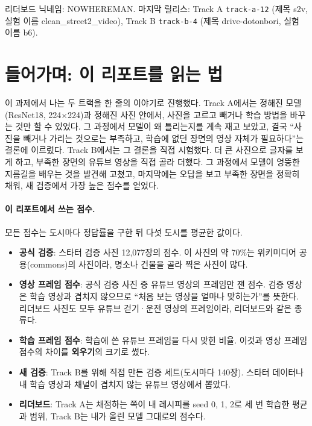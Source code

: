 \documentclass[11pt]{article}
\begin{document}
\makeheader

리더보드 닉네임: NOWHEREMAN. 마지막 릴리스: Track A \texttt{track-a-12} (제목 s2v, 실험 이름 clean\_street2\_video), Track B \texttt{track-b-4} (제목 drive-dotonbori, 실험 이름 b6).

\section*{들어가며: 이 리포트를 읽는 법}

이 과제에서 나는 두 트랙을 한 줄의 이야기로 진행했다. Track A에서는 정해진 모델(ResNet18, 224×224)과 정해진 사진 안에서, 사진을 고르고 빼거나 학습 방법을 바꾸는 것만 할 수 있었다. 그 과정에서 모델이 왜 틀리는지를 계속 재고 보았고, 결국 ``사진을 빼거나 가리는 것으로는 부족하고, 학습에 없던 장면의 영상 자체가 필요하다''는 결론에 이르렀다. Track B에서는 그 결론을 직접 시험했다. 더 큰 사진으로 글자를 보게 하고, 부족한 장면의 유튜브 영상을 직접 골라 더했다. 그 과정에서 모델이 엉뚱한 지름길을 배우는 것을 발견해 고쳤고, 마지막에는 오답을 보고 부족한 장면을 정확히 채워, 새 검증에서 가장 높은 점수를 얻었다.

\paragraph{이 리포트에서 쓰는 점수.} 모든 점수는 도시마다 정답률을 구한 뒤 다섯 도시를 평균한 값이다.
\begin{itemize}
\item \textbf{공식 검증}: 스타터 검증 사진 12,077장의 점수. 이 사진의 약 70\%는 위키미디어 공용(commons)의 사진이라, 명소나 건물을 골라 찍은 사진이 많다.
\item \textbf{영상 프레임 점수}: 공식 검증 사진 중 유튜브 영상의 프레임만 잰 점수. 검증 영상은 학습 영상과 겹치지 않으므로 ``처음 보는 영상을 얼마나 맞히는가''를 뜻한다. 리더보드 사진도 모두 유튜브 걷기·운전 영상의 프레임이라, 리더보드와 같은 종류다.
\item \textbf{학습 프레임 점수}: 학습에 쓴 유튜브 프레임을 다시 맞힌 비율. 이것과 영상 프레임 점수의 차이를 \textbf{외우기}의 크기로 썼다.
\item \textbf{새 검증}: Track B를 위해 직접 만든 검증 세트(도시마다 140장). 스타터 데이터나 내 학습 영상과 채널이 겹치지 않는 유튜브 영상에서 뽑았다.
\item \textbf{리더보드}: Track A는 채점하는 쪽이 내 레시피를 seed 0, 1, 2로 세 번 학습한 평균과 범위, Track B는 내가 올린 모델 그대로의 점수다.
\end{itemize}
\end{document}
